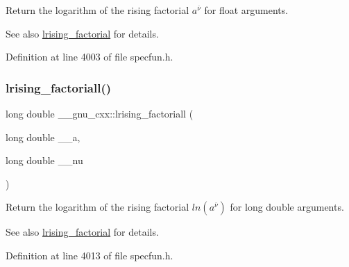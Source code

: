 Return the logarithm of the rising factorial $ a^{\overline{\nu}} $ for float arguments.

\begin{DoxySeeAlso}{See also}
\hyperlink{group__gnu__math__spec__func_ga8912b75b2f7592fb61128c766e7313b9}{lrising\+\_\+factorial} for details. 
\end{DoxySeeAlso}


Definition at line 4003 of file specfun.\+h.

\mbox{\label{group__gnu__math__spec__func_ga1ac811f56f38f7ea7a1e035ec0157f6b}} 
\subsubsection{\texorpdfstring{lrising\+\_\+factoriall()}{lrising\_factoriall()}}
{\footnotesize\ttfamily long double \+\_\+\+\_\+gnu\+\_\+cxx\+::lrising\+\_\+factoriall (\begin{DoxyParamCaption}\item[{long double}]{\+\_\+\+\_\+a,  }\item[{long double}]{\+\_\+\+\_\+nu }\end{DoxyParamCaption})\hspace{0.3cm}{\ttfamily [inline]}}

Return the logarithm of the rising factorial $ ln(a^{\overline{\nu}}) $ for {\ttfamily  long double } arguments.

\begin{DoxySeeAlso}{See also}
\hyperlink{group__gnu__math__spec__func_ga8912b75b2f7592fb61128c766e7313b9}{lrising\+\_\+factorial} for details. 
\end{DoxySeeAlso}


Definition at line 4013 of file specfun.\+h.

\mbox{\label{group__gnu__math__spec__func_ga1a51079e00fbe5473d8cf9ad3304c5c6}} 
